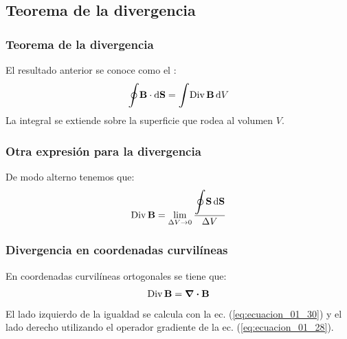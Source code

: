 \documentclass[12pt]{beamer}
\begin{document}
\subsection{Teorema de la divergencia}

\begin{frame}
\frametitle{Teorema de la divergencia}
El resultado anterior se conoce como el :
\pause
\begin{align}
\scaleoint{6ex} \vb{B} \cdot \dd{\vb{S}} = \scaleint{6ex} {\rm Div} \, \vb{B} \dd{V}
\label{eq:ecuacion_01_31}
\end{align}
La integral se extiende sobre la superficie que rodea al volumen $V$.
\end{frame}
\begin{frame}
\frametitle{Otra expresión para la divergencia}
De modo alterno tenemos que:
\pause
\begin{align*}
{\rm Div} \, \vb{B} = \lim_{\Delta V \to 0} \dfrac{\displaystyle \scaleoint{6ex} \vb{S} \dd{\vb{S}}}{\Delta V}
\end{align*}
\end{frame}
\begin{frame}
\frametitle{Divergencia en coordenadas curvilíneas}
En coordenadas curvilíneas ortogonales se tiene que:
\pause
\begin{align*}
{\rm Div} \, \vb{B} = \div{\vb{B}}
\end{align*}
\pause
El lado izquierdo de la igualdad se calcula con la ec. (\ref{eq:ecuacion_01_30}) y el lado derecho utilizando el operador gradiente de la ec. (\ref{eq:ecuacion_01_28}).
\end{frame}
\end{document}
